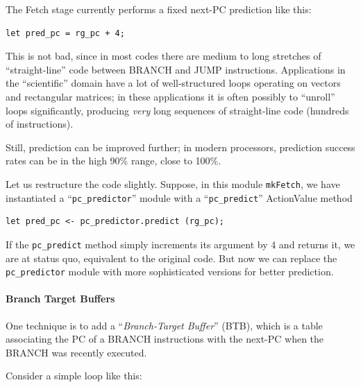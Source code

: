 \label{Sec_better_next_PC_prediction}

The Fetch stage currently performs a fixed next-PC prediction like this:

{\footnotesize
\begin{Verbatim}[frame=single, label=src\_Fife/S1\_Fetch.bsv]
      let pred_pc = rg_pc + 4;
\end{Verbatim}
}

This is not bad, since in most codes there are medium to long
stretches of ``straight-line'' code between BRANCH and JUMP
instructions.  Applications in the ``scientific'' domain have a lot of
well-structured loops operating on vectors and rectangular matrices;
in these applications it is often possibly to ``unroll'' loops
significantly, producing \emph{very} long sequences of straight-line
code (hundreds of instructions).

Still, prediction can be improved further; in modern processors,
prediction success rates can be in the high 90\% range, close to
100\%.

Let us restructure the code slightly.  Suppose, in this module
\verb|mkFetch|, we have instantiated a ``\verb|pc_predictor|'' module
with a ``\verb|pc_predict|'' ActionValue method

{\footnotesize
\begin{Verbatim}[frame=single, label=src\_Fife/S1\_Fetch.bsv]
      let pred_pc <- pc_predictor.predict (rg_pc);
\end{Verbatim}
}

If the \verb|pc_predict| method simply increments its argument by 4
and returns it, we are at status quo, {\ie} equivalent to the original
code.  But now we can replace the \verb|pc_predictor| module with more
sophisticated versions for better prediction.


\paragraph{Branch Target Buffers}

\label{Sec_BTBs}


One technique is to add a ``\emph{Branch-Target Buffer}'' (BTB), which
is a table associating the PC of a BRANCH instructions with the
next-PC when the BRANCH was recently executed.

Consider a simple loop like this:

